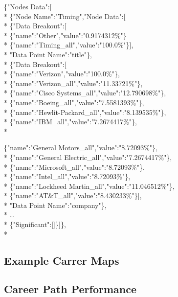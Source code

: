 \noindent \{"Nodes Data":[\\*
	\indent \{"Node Name":"Timing","Node Data":[\\*
		\indent \{"Data Breakout":[\\*
		\indent \indent	\{"name":"Other","value":"0.9174312\%"\}\\*
		\indent	\indent \{"name":"Timing_all","value":"100.0\%"\}],\\*
		\indent	"Data Point Name":"title"\},\\*
		\indent\{"Data Breakout":[\\*
		\indent	\indent	\{"name":"Verizon","value":"100.0\%"\},\\*
		\indent	\indent	\{"name":"Verizon_all","value":"11.33721\%"\},\\*
		\indent	\indent	\{"name":"Cisco Systems_all","value":"12.790698\%"\},\\*
		\indent	\indent	\{"name":"Boeing_all","value":"7.5581393\%"\},\\*
		\indent	\indent	\{"name":"Hewlit-Packard_all","value":"8.139535\%"\},\\*
		\indent	\indent	\{"name":"IBM_all","value":"7.2674417\%"\},\\*
		
		\indent	\indent	\{"name":"General Motors_all","value":"8.72093\%"\},\\*
		\indent	\indent	\{"name":"General Electric_all","value":"7.2674417\%"\},\\*
		\indent	\indent	\{"name":"Microsoft_all","value":"8.72093\%"\},\\*
		\indent	\indent	\{"name":"Intel_all","value":"8.72093\%"\},\\*
		\indent	\indent	\{"name":"Lockheed Martin_all","value":"11.046512\%"\},\\*
		\indent	\indent	\{"name":"AT&T_all","value":"8.430233\%"\}],\\*
		\indent"Data Point Name":"company"\},\\*
		\indent\ldots\\*
		\indent \{"Significant":[]\}]\},\\*

\subsection{Example Carrer Maps}

\subsection{Career Path Performance}